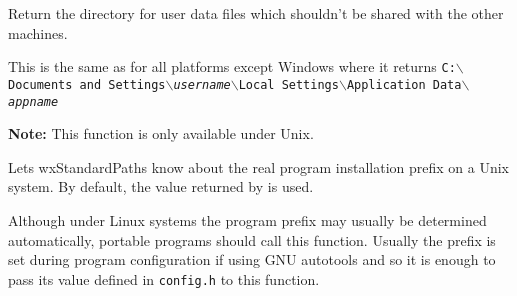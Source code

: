 \label{wxstandardpathsgetuserlocaldatadir}


Return the directory for user data files which shouldn't be shared with
the other machines.

This is the same as  for
all platforms except Windows where it returns 
\texttt{C:$\backslash$Documents and Settings$\backslash$\textit{username}$\backslash$Local Settings$\backslash$Application Data$\backslash$\textit{appname}}


\label{wxstandardpathssetinstallprefix}


\textbf{Note:} This function is only available under Unix.

Lets wxStandardPaths know about the real program installation prefix on a Unix
system. By default, the value returned by 
 is used.

Although under Linux systems the program prefix may usually be determined
automatically, portable programs should call this function. Usually the prefix
is set during program configuration if using GNU autotools and so it is enough
to pass its value defined in \texttt{config.h} to this function.


